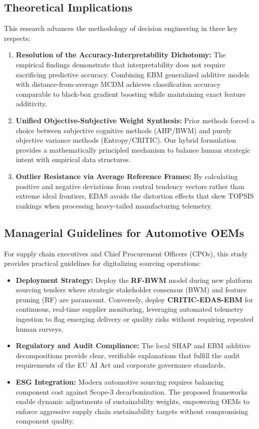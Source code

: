 \documentclass[twocolumn,10pt]{article}
\begin{document}
\subsection{Theoretical Implications}
This research advances the methodology of decision engineering in three key respects:
\begin{enumerate}
    \item \textbf{Resolution of the Accuracy-Interpretability Dichotomy:} The empirical findings demonstrate that interpretability does not require sacrificing predictive accuracy. Combining EBM generalized additive models with distance-from-average MCDM achieves classification accuracy comparable to black-box gradient boosting while maintaining exact feature additivity.
    \item \textbf{Unified Objective-Subjective Weight Synthesis:} Prior methods forced a choice between subjective cognitive methods (AHP/BWM) and purely objective variance methods (Entropy/CRITIC). Our hybrid formulation provides a mathematically principled mechanism to balance human strategic intent with empirical data structures.
    \item \textbf{Outlier Resistance via Average Reference Frames:} By calculating positive and negative deviations from central tendency vectors rather than extreme ideal frontiers, EDAS avoids the distortion effects that skew TOPSIS rankings when processing heavy-tailed manufacturing telemetry.
\end{enumerate}

\subsection{Managerial Guidelines for Automotive OEMs}
For supply chain executives and Chief Procurement Officers (CPOs), this study provides practical guidelines for digitalizing sourcing operations:
\begin{itemize}
    \item \textbf{Deployment Strategy:} Deploy the \textbf{RF-BWM} model during new platform sourcing tenders where strategic stakeholder consensus (BWM) and feature pruning (RF) are paramount. Conversely, deploy \textbf{CRITIC-EDAS-EBM} for continuous, real-time supplier monitoring, leveraging automated telemetry ingestion to flag emerging delivery or quality risks without requiring repeated human surveys.
    \item \textbf{Regulatory and Audit Compliance:} The local SHAP and EBM additive decompositions provide clear, verifiable explanations that fulfill the audit requirements of the EU AI Act and corporate governance standards.
    \item \textbf{ESG Integration:} Modern automotive sourcing requires balancing component cost against Scope-3 decarbonization. The proposed frameworks enable dynamic adjustments of sustainability weights, empowering OEMs to enforce aggressive supply chain sustainability targets without compromising component quality.
\end{itemize}
\end{document}

